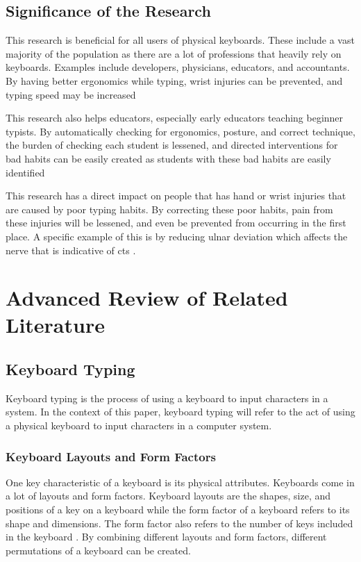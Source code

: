 \documentclass{report}
\begin{document}
\section{Significance of the Research}
This research is beneficial for all users of physical keyboards. These include a
vast majority of the population as there are a lot of professions that heavily
rely on keyboards. Examples include developers, physicians, educators, and
accountants. By having better ergonomics while typing, wrist injuries can be
prevented, and typing speed may be increased

This research also helps educators, especially early educators teaching beginner
typists. By automatically checking for ergonomics, posture, and correct
technique, the burden of checking each student is lessened, and directed
interventions for bad habits can be easily created as students with these bad
habits are easily identified

This research has a direct impact on people that has hand or wrist injuries that
are caused by poor typing habits. By correcting these poor habits, pain from
these injuries will be lessened, and even be prevented from occurring in the
first place. A specific example of this is by reducing ulnar deviation which
affects the nerve that is indicative of \ac{cts} \parencite{toosi2015}.

\chapter{Advanced Review of Related Literature}

\section{Keyboard Typing}

Keyboard typing is the process of using a keyboard to input characters in a
system. In the context of this paper, keyboard typing will refer to the act of
using a physical keyboard to input characters in a computer system.


\subsection{Keyboard Layouts and Form Factors}

One key characteristic of a keyboard is its physical attributes. Keyboards come
in a lot of layouts and form factors. Keyboard layouts are the shapes, size, and
positions of a key on a keyboard while the form factor of a keyboard refers to
its shape and dimensions. The form factor also refers to the number of keys included
in the keyboard \parencite{parkkinen2018}. By combining different layouts and
form factors, different permutations of a keyboard can be created.
\end{document}
